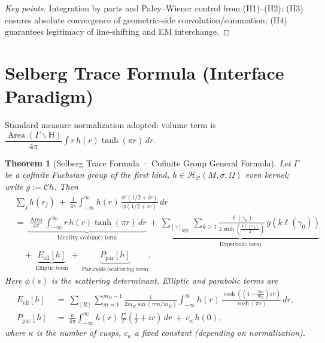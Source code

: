 \documentclass[11pt,a4paper]{article}
\newtheorem{theorem}{Theorem}[section]
\theoremstyle{remark}
\DeclareMathOperator{\Area}{Area}
\begin{document}
\begin{proof}[Key points]
Integration by parts and Paley--Wiener control from (H1)--(H2); (H3) ensures absolute convergence of geometric-side convolution/summation; (H4) guarantees legitimacy of line-shifting and EM interchange.
\end{proof}

\section{Selberg Trace Formula (Interface Paradigm)}

Standard measure normalization adopted: volume term is $\dfrac{\Area(\Gamma\backslash\mathbb{H})}{4\pi}\int r\,h(r)\tanh(\pi r)\,dr$.

\begin{theorem}[Selberg Trace Formula · Cofinite Group General Formula]\label{thm:selberg}
Let $\Gamma$ be a cofinite Fuchsian group of the first kind, $h\in \mathscr{H}_{\mathcal{C}}(M,\sigma,\Omega)$ even kernel; write $g:=\mathcal{C} h$. Then
\begin{equation}
\boxed{
\begin{aligned}
&\sum_j h(r_j)\ +\ \frac{1}{4\pi}\int_{-\infty}^{\infty} h(r)\,\frac{\phi'(1/2+ir)}{\phi(1/2+ir)}\,dr \\
&=\ \underbrace{\frac{\Area}{4\pi}\int_{-\infty}^{\infty} r\,h(r)\tanh(\pi r)\,dr}_{\text{Identity (volume) term}}
\ +\ \underbrace{\sum_{[\gamma]_{\mathrm{hyp}}}\ \sum_{k\ge1}\frac{\ell(\gamma_0)}{2\sinh\left(\tfrac{k \ell(\gamma_0)}{2}\right)}\,g\left(k \ell(\gamma_0)\right)}_{\text{Hyperbolic term}}\\
&\quad+\ \underbrace{E_{\mathrm{ell}}[h]}_{\text{Elliptic term}}
\ +\ \underbrace{P_{\mathrm{par}}[h]}_{\text{Parabolic/scattering term}}.
\end{aligned}}
\end{equation}
Here $\phi(s)$ is the scattering determinant. Elliptic and parabolic terms are
\begin{equation}
\begin{aligned}
E_{\mathrm{ell}}[h]\ &=\ \sum_{[R]} \sum_{m=1}^{m_R-1}\frac{1}{2m_R\sin(\pi m/m_R)}
\int_{-\infty}^{\infty} h(r)\,\frac{\cosh\left((1-\tfrac{2m}{m_R}) \pi r\right)}{\cosh(\pi r)}\,dr,\\[2pt]
P_{\mathrm{par}}[h]\ &=\ \frac{\kappa}{4\pi}\int_{-\infty}^{\infty} h(r)\,\frac{\Gamma'}{\Gamma}\left(\tfrac{1}{2}+ir\right)\,dr\ +\ c_\kappa\,h(0),
\end{aligned}
\end{equation}
where $\kappa$ is the number of cusps, $c_\kappa$ a fixed constant (depending on normalization).
\end{theorem}
\end{document}
